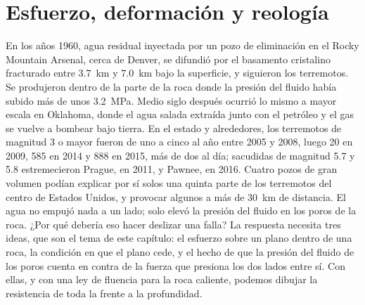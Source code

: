 \chapter{Esfuerzo, deformación y reología}\label{ch:b1:stress-strain-rheology}

En los años 1960, agua residual inyectada por un pozo de eliminación en el Rocky Mountain Arsenal, cerca de Denver, se difundió por el basamento
cristalino fracturado entre \qty{3.7}{km} y \qty{7.0}{km} bajo la superficie, y siguieron los terremotos. Se produjeron dentro de la parte de la roca
donde la presión del fluido había subido más de unos \qty{3.2}{MPa}.
Medio siglo después ocurrió lo mismo a mayor escala en Oklahoma, donde el agua salada extraída junto con el petróleo y el gas se vuelve a bombear bajo
tierra. En el estado y alrededores, los terremotos de magnitud 3 o mayor fueron de uno a cinco al año entre 2005 y 2008, luego \num{20} en 2009,
\num{585} en 2014 y \num{888} en 2015, más de dos al día; sacudidas de magnitud 5.7 y 5.8 estremecieron Prague, en 2011, y Pawnee, en 2016. Cuatro pozos
de gran volumen podían explicar por sí solos una quinta parte de los terremotos del centro de Estados Unidos, y provocar algunos a más de \qty{30}{km}
de distancia.
El agua no empujó nada a un lado; solo elevó la presión del fluido en los poros de la roca. ¿Por qué debería eso hacer deslizar una falla? La respuesta
necesita tres ideas, que son el tema de este capítulo: el esfuerzo sobre un plano dentro de una roca, la condición en que el plano cede, y el hecho de que
la presión del fluido de los poros cuenta en contra de la fuerza que presiona los dos lados entre sí. Con ellas, y con una ley de fluencia para la roca caliente,
podemos dibujar la resistencia de toda la  frente a la profundidad.

